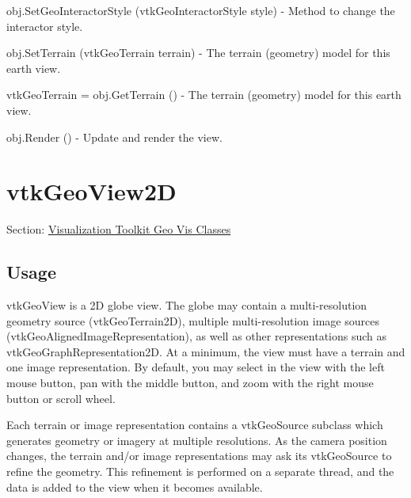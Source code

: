\begin{DoxyItemize}
\item {\ttfamily obj.\-Set\-Geo\-Interactor\-Style (vtk\-Geo\-Interactor\-Style style)} -\/ Method to change the interactor style.  
\item {\ttfamily obj.\-Set\-Terrain (vtk\-Geo\-Terrain terrain)} -\/ The terrain (geometry) model for this earth view.  
\item {\ttfamily vtk\-Geo\-Terrain = obj.\-Get\-Terrain ()} -\/ The terrain (geometry) model for this earth view.  
\item {\ttfamily obj.\-Render ()} -\/ Update and render the view.  
\end{DoxyItemize}\hypertarget{vtkgeovis_vtkgeoview2d}{}\section{vtk\-Geo\-View2\-D}\label{vtkgeovis_vtkgeoview2d}
Section\-: \hyperlink{sec_vtkgeovis}{Visualization Toolkit Geo Vis Classes} \hypertarget{vtkwidgets_vtkxyplotwidget_Usage}{}\subsection{Usage}\label{vtkwidgets_vtkxyplotwidget_Usage}
vtk\-Geo\-View is a 2\-D globe view. The globe may contain a multi-\/resolution geometry source (vtk\-Geo\-Terrain2\-D), multiple multi-\/resolution image sources (vtk\-Geo\-Aligned\-Image\-Representation), as well as other representations such as vtk\-Geo\-Graph\-Representation2\-D. At a minimum, the view must have a terrain and one image representation. By default, you may select in the view with the left mouse button, pan with the middle button, and zoom with the right mouse button or scroll wheel.

Each terrain or image representation contains a vtk\-Geo\-Source subclass which generates geometry or imagery at multiple resolutions. As the camera position changes, the terrain and/or image representations may ask its vtk\-Geo\-Source to refine the geometry. This refinement is performed on a separate thread, and the data is added to the view when it becomes available.

